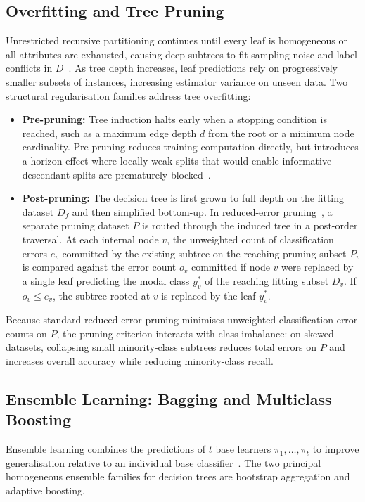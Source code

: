 \subsection{Overfitting and Tree Pruning}
\label{subsec:bg_pruning}
Unrestricted recursive partitioning continues until every leaf is homogeneous or all attributes are exhausted, causing deep subtrees to fit sampling noise and label conflicts in $D$~\cite{Kelleher2020}. As tree depth increases, leaf predictions rely on progressively smaller subsets of instances, increasing estimator variance on unseen data. Two structural regularisation families address tree overfitting:
\begin{itemize}
    \item \textbf{Pre-pruning:} Tree induction halts early when a stopping condition is reached, such as a maximum edge depth $d$ from the root or a minimum node cardinality. Pre-pruning reduces training computation directly, but introduces a horizon effect where locally weak splits that would enable informative descendant splits are prematurely blocked~\cite{Kelleher2020}.
    \item \textbf{Post-pruning:} The decision tree is first grown to full depth on the fitting dataset $D_f$ and then simplified bottom-up. In reduced-error pruning~\cite{Kelleher2020,Quinlan1993}, a separate pruning dataset $P$ is routed through the induced tree in a post-order traversal. At each internal node $v$, the unweighted count of classification errors $e_v$ committed by the existing subtree on the reaching pruning subset $P_v$ is compared against the error count $o_v$ committed if node $v$ were replaced by a single leaf predicting the modal class $y^*_v$ of the reaching fitting subset $D_v$. If $o_v \le e_v$, the subtree rooted at $v$ is replaced by the leaf $y^*_v$.
\end{itemize}
Because standard reduced-error pruning minimises unweighted classification error counts on $P$, the pruning criterion interacts with class imbalance: on skewed datasets, collapsing small minority-class subtrees reduces total errors on $P$ and increases overall accuracy while reducing minority-class recall.

\subsection{Ensemble Learning: Bagging and Multiclass Boosting}
\label{subsec:bg_ensembles}
Ensemble learning combines the predictions of $t$ base learners $\pi_1, \dots, \pi_t$ to improve generalisation relative to an individual base classifier~\cite{Kelleher2020}. The two principal homogeneous ensemble families for decision trees are bootstrap aggregation and adaptive boosting.

